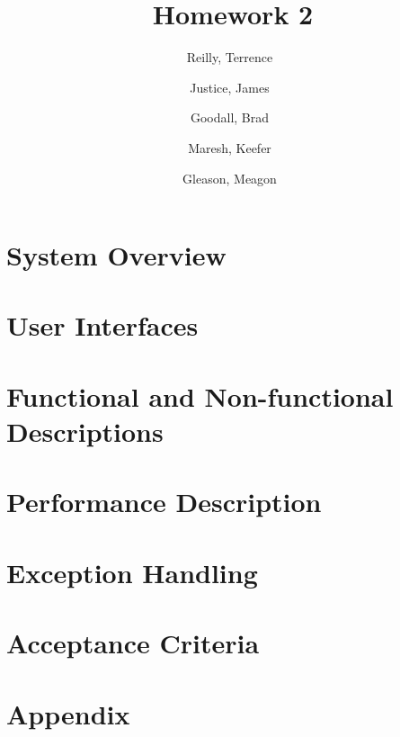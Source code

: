 \documentclass[a4paper,12pt]{article}
\author{
    Reilly, Terrence\
    \and
    Justice, James\
    \and
    Goodall, Brad\
    \and
    Maresh, Keefer\
    \and
    Gleason, Meagon\
}
\title{Homework 2}
\begin{document}
    \maketitle

    \section*{System Overview}
        

    \section*{User Interfaces}
        

    \section*{Functional and Non-functional Descriptions}
        

    \section*{Performance Description}
        

    \section*{Exception Handling}
        

    \section*{Acceptance Criteria}
        

    \section*{Appendix}
        
\end{document}
